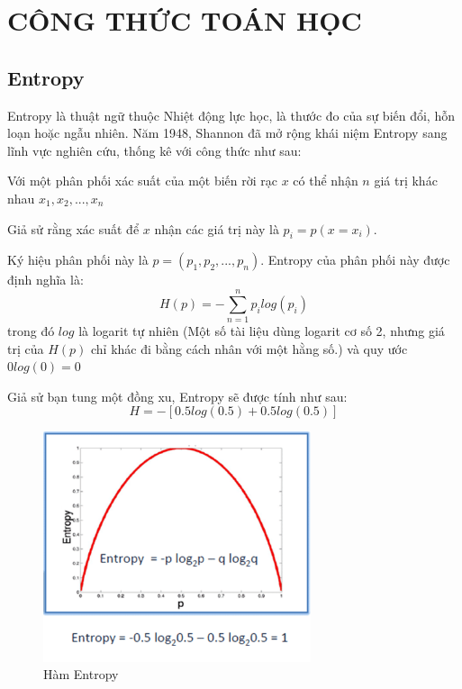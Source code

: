 \chapter{CÔNG THỨC TOÁN HỌC}

\section{Entropy}
Entropy là thuật ngữ thuộc Nhiệt động lực học, là thước đo của sự biến đổi,
hỗn loạn hoặc ngẫu nhiên.
Năm 1948, Shannon đã mở rộng khái niệm Entropy sang lĩnh vực nghiên cứu,
thống kê với công thức như sau:

Với một phân phối xác suất của một biến rời rạc $x$ có thể nhận $n$ giá trị
khác nhau $x_1, x_2,..., x_n$

Giả sử rằng xác suất để $x$ nhận các giá trị này là $p_i=p(x=x_i)$.

Ký hiệu phân phối này là $p=(p_1, p_2,..., p_n)$.
Entropy của phân phối này được định nghĩa là:
\begin{equation*}
    H(p)=-\sum_{n=1}^{n}p_ilog(p_i)
\end{equation*}
trong đó $log$ là logarit tự nhiên
(Một số tài liệu dùng logarit cơ số 2, nhưng giá trị của $H(p)$
chỉ khác đi bằng cách nhân với một hằng số.) và quy ước $0log(0)=0$

Giả sử bạn tung một đồng xu, Entropy sẽ được tính như sau:
\begin{equation*}
    H = -[0.5log(0.5) + 0.5log(0.5)]
\end{equation*}

\begin{figure}[ht]
    \centering
    \includegraphics[width=0.7\textwidth]{thesis/decision-tree/mathematical/dt_ex2.png}
    \caption{Hàm Entropy}
    \label{fig:dt_ex2}
\end{figure}

